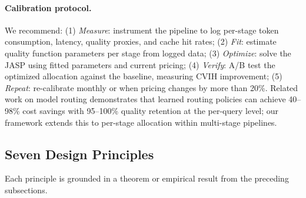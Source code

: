 \documentclass[11pt, a4paper]{googledeepmind}
\begin{document}
\paragraph{Calibration protocol.} We recommend: (1) \emph{Measure}: instrument the pipeline to log per-stage token consumption, latency, quality proxies, and cache hit rates; (2) \emph{Fit}: estimate quality function parameters per stage from logged data; (3) \emph{Optimize}: solve the JASP using fitted parameters and current pricing; (4) \emph{Verify}: A/B test the optimized allocation against the baseline, measuring CVIH improvement; (5) \emph{Repeat}: re-calibrate monthly or when pricing changes by more than 20\%. Related work on model routing \citep{chen2023frugalgpt, madaan2024automix, ong2024routellm} demonstrates that learned routing policies can achieve 40--98\% cost savings with 95--100\% quality retention at the per-query level; our framework extends this to per-stage allocation within multi-stage pipelines.

\subsection{Seven Design Principles}

Each principle is grounded in a theorem or empirical result from the preceding subsections.
\end{document}
